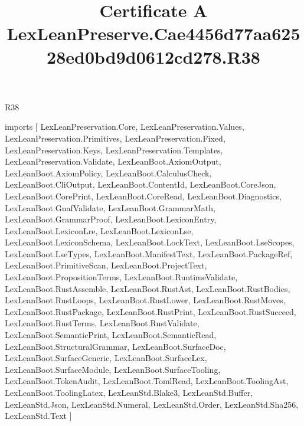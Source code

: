 \begin{lexlean}{R38}
\title{Certificate A LexLeanPreserve.Cae4456d77aa62528ed0bd9d0612cd278.R38}
\begin{coremodule}
imports [
  LexLeanPreservation.Core,
  LexLeanPreservation.Values,
  LexLeanPreservation.Primitives,
  LexLeanPreservation.Fixed,
  LexLeanPreservation.Keys,
  LexLeanPreservation.Templates,
  LexLeanPreservation.Validate,
  LexLeanBoot.AxiomOutput,
  LexLeanBoot.AxiomPolicy,
  LexLeanBoot.CalculusCheck,
  LexLeanBoot.CliOutput,
  LexLeanBoot.ContentId,
  LexLeanBoot.CoreJson,
  LexLeanBoot.CorePrint,
  LexLeanBoot.CoreRead,
  LexLeanBoot.Diagnostics,
  LexLeanBoot.GnafValidate,
  LexLeanBoot.GrammarMath,
  LexLeanBoot.GrammarProof,
  LexLeanBoot.LexiconEntry,
  LexLeanBoot.LexiconLre,
  LexLeanBoot.LexiconLse,
  LexLeanBoot.LexiconSchema,
  LexLeanBoot.LockText,
  LexLeanBoot.LseScopes,
  LexLeanBoot.LseTypes,
  LexLeanBoot.ManifestText,
  LexLeanBoot.PackageRef,
  LexLeanBoot.PrimitiveScan,
  LexLeanBoot.ProjectText,
  LexLeanBoot.PropositionTerms,
  LexLeanBoot.RuntimeValidate,
  LexLeanBoot.RustAssemble,
  LexLeanBoot.RustAst,
  LexLeanBoot.RustBodies,
  LexLeanBoot.RustLoops,
  LexLeanBoot.RustLower,
  LexLeanBoot.RustMoves,
  LexLeanBoot.RustPackage,
  LexLeanBoot.RustPrint,
  LexLeanBoot.RustSucceed,
  LexLeanBoot.RustTerms,
  LexLeanBoot.RustValidate,
  LexLeanBoot.SemanticPrint,
  LexLeanBoot.SemanticRead,
  LexLeanBoot.StructuralGrammar,
  LexLeanBoot.SurfaceDoc,
  LexLeanBoot.SurfaceGeneric,
  LexLeanBoot.SurfaceLex,
  LexLeanBoot.SurfaceModule,
  LexLeanBoot.SurfaceTooling,
  LexLeanBoot.TokenAudit,
  LexLeanBoot.TomlRead,
  LexLeanBoot.ToolingAst,
  LexLeanBoot.ToolingLatex,
  LexLeanStd.Blake3,
  LexLeanStd.Buffer,
  LexLeanStd.Json,
  LexLeanStd.Numeral,
  LexLeanStd.Order,
  LexLeanStd.Sha256,
  LexLeanStd.Text
]


\end{coremodule}
\end{lexlean}
